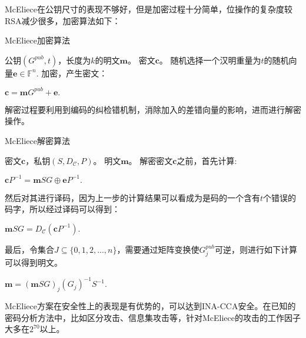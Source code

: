 McEliece在公钥尺寸的表现不够好，但是加密过程十分简单，位操作的复杂度较RSA减少很多，加密算法如下：

\begin{breakablealgorithm}
	\small
	\renewcommand{\algorithmicrequire}{\textbf{Input:}}
	\renewcommand{\algorithmicensure}{\textbf{Output:}}
	\caption{McEliece加密算法}
	\label{alg:McElieceEn}
	\begin{algorithmic}[1]		
		\Require
		公钥$(G^{pub},t)$，长度为$k$的明文$\mathbf{m}$。
		\Ensure
		密文$\mathbf{c}$。
		\State
		随机选择一个汉明重量为$t$的随机向量$\mathbf{e} \in \mathbb{F}^n$.
		\State
		加密，产生密文：
		
		\centering $\mathbf{c} = \mathbf{m}G^{pub} + \mathbf{e}.$
	\end{algorithmic}
\end{breakablealgorithm}

解密过程要利用到编码的纠检错机制，消除加入的差错向量的影响，进而进行解密操作。

\begin{breakablealgorithm}
	\small
	\renewcommand{\algorithmicrequire}{\textbf{Input:}}
	\renewcommand{\algorithmicensure}{\textbf{Output:}}
	\caption{McEliece解密算法}
	\label{alg:McElieceDe}
	\begin{algorithmic}[1]		
		\Require
		密文$\mathbf{c}$，私钥$(S,D_\mathcal{C},P)$。
		\Ensure
		明文$\mathbf{m}$。
		\State
		解密密文$\mathbf{c}$之前，首先计算:
		\begin{center}
			$\mathbf{c}P^{-1} = \mathbf{m}SG \oplus\textbf{e}P^{-1}.$
		\end{center}		

		\State
		然后对其进行译码，因为上一步的计算结果可以看成为是码的一个含有$t$个错误的码字，所以经过译码可以得到：
		\begin{center}
			$\mathbf{m}SG = D_\mathcal{C}(\mathbf{c}P^{-1}).$
		\end{center}
		
		\State
		最后，令集合$J \subseteq \{0,1,2,...,n\}$，需要通过矩阵变换使$G_j^{pub}$可逆，则进行如下计算可以得到明文。
		\begin{center}
			$\mathbf{m} = (\mathbf{m}SG)_j(G_j)^{-1}S^{-1}.$
		\end{center}		
	\end{algorithmic}
\end{breakablealgorithm}

McEliece方案在安全性上的表现是有优势的，可以达到INA-CCA安全。在已知的密码分析方法中，比如区分攻击、信息集攻击等，针对McEliece的攻击的工作因子大多在$2^{70}$以上。

